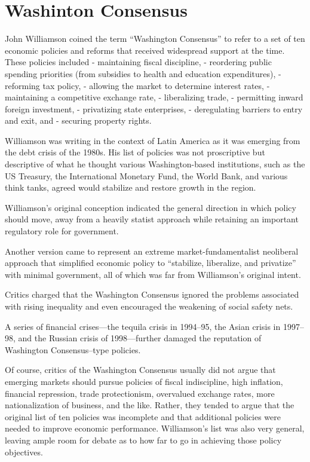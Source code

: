 \documentclass[
]{book}
\begin{document}
\hypertarget{washinton-consensus}{%
\section{Washinton Consensus}\label{washinton-consensus}}

John Williamson coined the term ``Washington Consensus'' to refer to a set of ten economic policies and reforms that received widespread support at the time.
These policies included
- maintaining fiscal discipline,
- reordering public spending priorities (from subsidies to health and education expenditures),
- reforming tax policy,
- allowing the market to determine interest rates,
- maintaining a competitive exchange rate,
- liberalizing trade,
- permitting inward foreign investment,
- privatizing state enterprises,
- deregulating barriers to entry and exit, and
- securing property rights.

Williamson was writing in the context of Latin America as it was emerging from the debt crisis of the 1980s. His list of policies was not proscriptive but descriptive of what he thought various Washington-based institutions, such as the US Treasury, the International Monetary Fund, the World Bank, and various think tanks, agreed would stabilize and restore growth in the region.

Williamson's original conception indicated the general direction in which policy should move, away from a heavily statist approach while retaining an important regulatory role for government.

Another version came to represent an extreme market-fundamentalist neoliberal approach that simplified economic policy to ``stabilize, liberalize, and privatize'' with minimal government, all of which was far from Williamson's original intent.

Critics charged that the Washington Consensus ignored the problems associated with rising inequality and even encouraged the weakening of social safety nets.

A series of financial crises---the tequila crisis in 1994--95, the Asian crisis in 1997--98, and the Russian crisis of 1998---further damaged the reputation of Washington Consensus--type policies.

Of course, critics of the Washington Consensus usually did not argue that emerging markets should pursue policies of fiscal indiscipline, high inflation, financial repression, trade protectionism, overvalued exchange rates, more nationalization of business, and the like. Rather, they tended to argue that the original list of ten policies was incomplete and that additional policies were needed to improve economic performance. Williamson's list was also very general, leaving ample room for debate as to how far to go in achieving those policy objectives.
\end{document}
